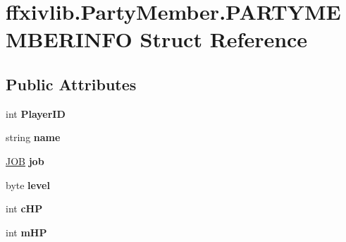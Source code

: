 \hypertarget{structffxivlib_1_1_party_member_1_1_p_a_r_t_y_m_e_m_b_e_r_i_n_f_o}{\section{ffxivlib.\-Party\-Member.\-P\-A\-R\-T\-Y\-M\-E\-M\-B\-E\-R\-I\-N\-F\-O Struct Reference}
\label{structffxivlib_1_1_party_member_1_1_p_a_r_t_y_m_e_m_b_e_r_i_n_f_o}
}
\subsection*{Public Attributes}
\begin{DoxyCompactItemize}
\item 
\hypertarget{structffxivlib_1_1_party_member_1_1_p_a_r_t_y_m_e_m_b_e_r_i_n_f_o_a58cd6e399a19de16d25ddd42e8518144}{int {\bfseries Player\-I\-D}}\label{structffxivlib_1_1_party_member_1_1_p_a_r_t_y_m_e_m_b_e_r_i_n_f_o_a58cd6e399a19de16d25ddd42e8518144}

\item 
\hypertarget{structffxivlib_1_1_party_member_1_1_p_a_r_t_y_m_e_m_b_e_r_i_n_f_o_a4492548143962ad7df8b67a6002c6045}{string {\bfseries name}}\label{structffxivlib_1_1_party_member_1_1_p_a_r_t_y_m_e_m_b_e_r_i_n_f_o_a4492548143962ad7df8b67a6002c6045}

\item 
\hypertarget{structffxivlib_1_1_party_member_1_1_p_a_r_t_y_m_e_m_b_e_r_i_n_f_o_af10347eeb797e20f6de779bbbbadcff4}{\hyperlink{namespaceffxivlib_a7273810711af045adb7151580e025a86}{J\-O\-B} {\bfseries job}}\label{structffxivlib_1_1_party_member_1_1_p_a_r_t_y_m_e_m_b_e_r_i_n_f_o_af10347eeb797e20f6de779bbbbadcff4}

\item 
\hypertarget{structffxivlib_1_1_party_member_1_1_p_a_r_t_y_m_e_m_b_e_r_i_n_f_o_a89ee49f09068f4c061341b09a600f6fd}{byte {\bfseries level}}\label{structffxivlib_1_1_party_member_1_1_p_a_r_t_y_m_e_m_b_e_r_i_n_f_o_a89ee49f09068f4c061341b09a600f6fd}

\item 
\hypertarget{structffxivlib_1_1_party_member_1_1_p_a_r_t_y_m_e_m_b_e_r_i_n_f_o_aaf8131973fc3b9edb108d5b98e5edb78}{int {\bfseries c\-H\-P}}\label{structffxivlib_1_1_party_member_1_1_p_a_r_t_y_m_e_m_b_e_r_i_n_f_o_aaf8131973fc3b9edb108d5b98e5edb78}

\item 
\hypertarget{structffxivlib_1_1_party_member_1_1_p_a_r_t_y_m_e_m_b_e_r_i_n_f_o_abd323379e9c68fdac70c7ed6522eec5b}{int {\bfseries m\-H\-P}}\label{structffxivlib_1_1_party_member_1_1_p_a_r_t_y_m_e_m_b_e_r_i_n_f_o_abd323379e9c68fdac70c7ed6522eec5b}


\end{DoxyCompactItemize}
